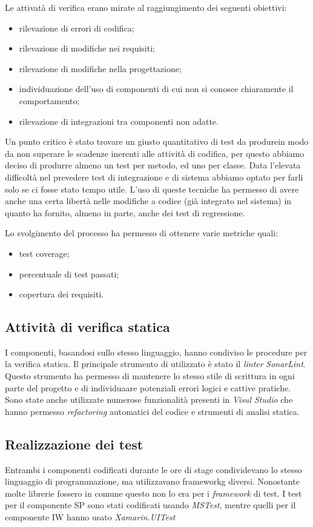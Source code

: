 Le attivatà di verifica erano mirate al raggiungimento dei seguenti obiettivi: 
\begin{itemize}
    \item rilevazione di errori di codifica;
    \item rilevazione di modifiche nei requisiti;
    \item rilevazione di modifiche nella progettazione;
    \item individuazione dell’uso di componenti di cui non si conosce chiaramente il comportamento;
    \item rilevazione di integrazioni tra componenti non adatte.
\end{itemize}
\medskip
Un punto critico è stato trovare un giusto quantitativo di test da produrein modo da non superare le scadenze inerenti alle attività di codifica, per questo abbiamo deciso di produrre almeno un test per metodo, ed uno per classe. 
Data l’elevata difficoltà nel prevedere test di integrazione e di sistema abbiamo optato per farli solo se ci fosse stato tempo utile. 
L'uso di queste tecniche ha permesso di avere anche una certa libertà nelle modifiche a codice (già integrato nel sistema) in quanto ha fornito, almeno in parte, anche dei test di regressione. 

Lo svolgimento del processo ha permesso di ottenere varie metriche quali:
\begin{itemize}
    \item test coverage;
    \item percentuale di test passati;
    \item copertura dei requisiti.
\end{itemize}

\subsection{Attività di verifica statica}
I componenti, basandosi sullo stesso linguaggio, hanno condiviso le procedure per la verifica statica. Il principale strumento di utilizzato è stato il \emph{linter} \emph{SonarLint}. Questo strumento ha permesso di mantenere lo stesso stile di scrittura in ogni parte del progetto e di individuaare potenziali errori logici e cattive pratiche. 
Sono state anche utilizzate numerose funzionalità presenti in \emph{Visul Studio} che hanno permesso \emph{refactoring} automatici del codice e strumenti di analisi statica.

\subsection{Realizzazione dei test}
Entrambi i componenti codificati durante le ore di stage condividevano lo stesso linguaggio di programmazione, ma utilizzavano \gls{frameworkg} diversi. Nonostante molte librerie fossero in comune questo non lo era per i \emph{framework} di test. I test per il componente SP sono stati codificati usando \emph{MSTest}, mentre quelli per il componente IW hanno usato \emph{Xamarin.UITest}

